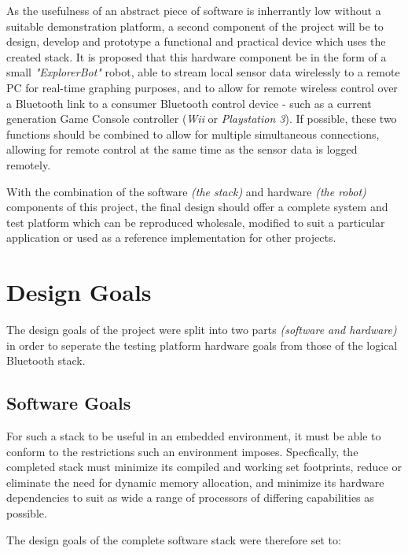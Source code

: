 As the usefulness of an abstract piece of software is inherrantly low without a suitable demonstration platform, a second component of the project will be to design, develop and prototype a functional and practical device which uses the created stack. It is proposed that this hardware component be in the form of a small \textit{"ExplorerBot"} robot, able to stream local sensor data wirelessly to a remote PC for real-time graphing purposes, and to allow for remote wireless control over a Bluetooth link to a consumer Bluetooth control device - such as a current generation Game Console controller (\textit{Wii} or \textit{Playstation 3}). If possible, these two functions should be combined to allow for multiple simultaneous connections, allowing for remote control at the same time as the sensor data is logged remotely.


With the combination of the software \emph{(the stack)} and hardware \emph{(the robot)} components of this project, the final design should offer a complete system and test platform which can be reproduced wholesale, modified to suit a particular application or used as a reference implementation for other projects.

\section{Design Goals}

The design goals of the project were split into two parts \emph{(software and hardware)} in order to seperate the testing platform hardware goals from those of the logical Bluetooth stack.

\subsection{Software Goals}

For such a stack to be useful in an embedded environment, it must be able to conform to the restrictions such an environment imposes. Specfically, the completed stack must minimize its compiled and working set footprints, reduce or eliminate the need for dynamic memory allocation, and minimize its hardware dependencies to suit as wide a range of processors of differing capabilities as possible.

The design goals of the complete software stack were therefore set to:

